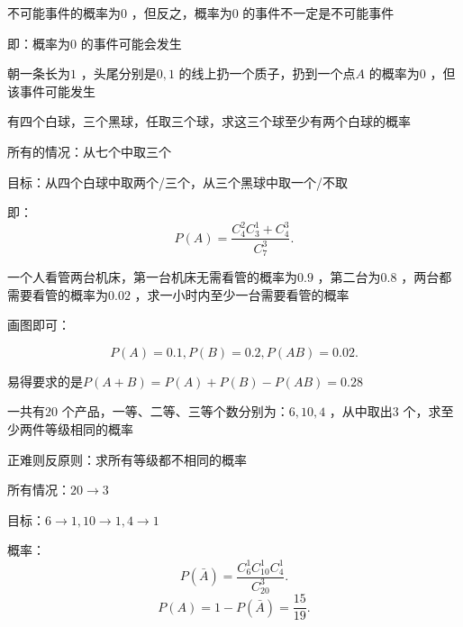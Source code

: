 \begin{notation}
    不可能事件的概率为$0$ ，但反之，概率为$0$ 的事件不一定是不可能事件

    即：概率为$0$ 的事件可能会发生
    \begin{eg}
        朝一条长为$1$ ，头尾分别是$0,1$ 的线上扔一个质子，扔到一个点$A$ 的概率为$0$ ，但该事件可能发生
    \end{eg}
\end{notation}

\begin{eg}
    有四个白球，三个黑球，任取三个球，求这三个球至少有两个白球的概率

    所有的情况：从七个中取三个

    目标：从四个白球中取两个/三个，从三个黑球中取一个/不取

    即：\[
        P\left( A \right) =\frac{C_{4}^{2}C_{3}^{1}+C_{4}^{3}}{C_{7}^{3}}
    .\] 
\end{eg}
\begin{eg}
    一个人看管两台机床，第一台机床无需看管的概率为$0.9$ ，第二台为$0.8$ ，两台都需要看管的概率为$0.02$ ，求一小时内至少一台需要看管的概率

    画图即可：
    \begin{center}
    \end{center}
    \[
        P\left( A \right) =0.1,P\left( B \right) =0.2,P\left( AB \right) =0.02
    .\] 
    
    易得要求的是$P\left( A+B \right) =P\left( A \right) +P\left( B \right) -P\left( AB \right) =0.28$
\end{eg}
\begin{eg}
    一共有$20$ 个产品，一等、二等、三等个数分别为：$6,10,4$ ，从中取出$3$ 个，求至少两件等级相同的概率

    正难则反原则：求所有等级都不相同的概率

    所有情况：$20\to 3$

    目标：$6\to 1,10\to 1,4\to 1$ 

    概率：
     \[
        P\left( \bar{A} \right) =\frac{C_{6}^{1}C_{10}^{1}C_{4}^{1}}{C_{20}^{3}}
    .\] 
     \[
        P\left( A \right) =1-P\left( \bar{A} \right) =\frac{15}{19}
    .\] 

\end{eg}
